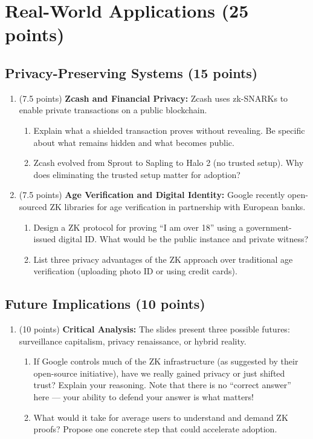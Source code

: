 \documentclass[10pt,a4paper,american]{article}
\begin{document}
\section{Real-World Applications (25 points)}

\subsection{Privacy-Preserving Systems (15 points)}

\begin{enumerate}
	\item (7.5 points) \textbf{Zcash and Financial Privacy:}
	      Zcash uses zk-SNARKs to enable private transactions on a public blockchain.
	      \begin{enumerate}
		      \item Explain what a shielded transaction proves without revealing. Be specific about what remains hidden and what becomes public.
		      \item Zcash evolved from Sprout to Sapling to Halo 2 (no trusted setup). Why does eliminating the trusted setup matter for adoption?
	      \end{enumerate}
	\item (7.5 points) \textbf{Age Verification and Digital Identity:}
	      Google recently open-sourced ZK libraries for age verification in partnership with European banks.
	      \begin{enumerate}
		      \item Design a ZK protocol for proving ``I am over 18'' using a government-issued digital ID. What would be the public instance and private witness?
		      \item List three privacy advantages of the ZK approach over traditional age verification (uploading photo ID or using credit cards).
	      \end{enumerate}
\end{enumerate}

\subsection{Future Implications (10 points)}

\begin{enumerate}
	\item (10 points) \textbf{Critical Analysis:}
	      The slides present three possible futures: surveillance capitalism, privacy renaissance, or hybrid reality.
	      \begin{enumerate}
		      \item If Google controls much of the ZK infrastructure (as suggested by their open-source initiative), have we really gained privacy or just shifted trust? Explain your reasoning. Note that there is no ``correct answer'' here — your ability to defend your answer is what matters!
		      \item What would it take for average users to understand and demand ZK proofs? Propose one concrete step that could accelerate adoption.
	      \end{enumerate}
\end{enumerate}
\end{document}
